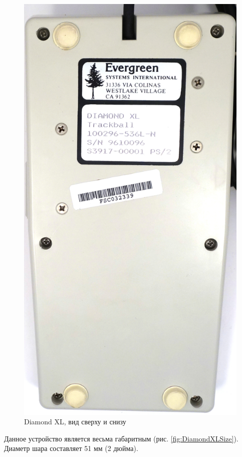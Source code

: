 \documentclass[11pt, a4paper]{article}
\begin{document}
\begin{figure}[h]
    \includegraphics[scale=0.35]{1993_evergreen_diamond_xl_trackball/bottom_30.jpg}
    \caption{Diamond XL, вид сверху и снизу}
     \label{fig:DiamondXLTopBottom}
\end{figure}

Данное устройство является весьма габаритным (рис. \ref{fig:DiamondXLSize}). Диаметр шара составляет 51 мм (2 дюйма).
\end{document}
